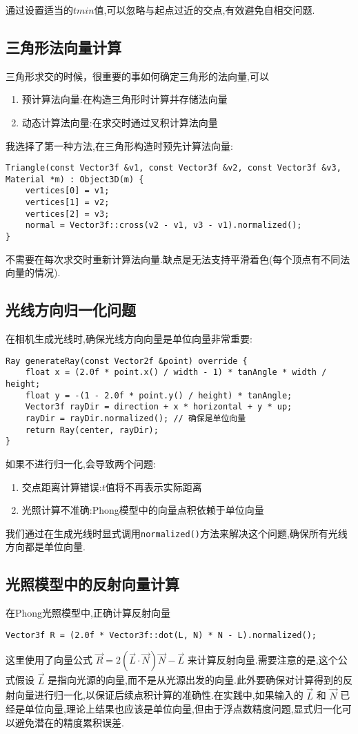\documentclass[a4paper,twoside]{article}
\begin{document}
通过设置适当的$tmin$值,可以忽略与起点过近的交点,有效避免自相交问题.

\subsection{三角形法向量计算}
三角形求交的时候，很重要的事如何确定三角形的法向量,可以

\begin{enumerate}
    \item 预计算法向量:在构造三角形时计算并存储法向量
    \item 动态计算法向量:在求交时通过叉积计算法向量
\end{enumerate}
我选择了第一种方法,在三角形构造时预先计算法向量:
\begin{verbatim}
Triangle(const Vector3f &v1, const Vector3f &v2, const Vector3f &v3, Material *m) : Object3D(m) {
    vertices[0] = v1;
    vertices[1] = v2;
    vertices[2] = v3;
    normal = Vector3f::cross(v2 - v1, v3 - v1).normalized();
}
\end{verbatim}

不需要在每次求交时重新计算法向量.缺点是无法支持平滑着色(每个顶点有不同法向量的情况).

\subsection{光线方向归一化问题}
在相机生成光线时,确保光线方向向量是单位向量非常重要:
\begin{verbatim}
Ray generateRay(const Vector2f &point) override {
    float x = (2.0f * point.x() / width - 1) * tanAngle * width / height;
    float y = -(1 - 2.0f * point.y() / height) * tanAngle;
    Vector3f rayDir = direction + x * horizontal + y * up;
    rayDir = rayDir.normalized(); // 确保是单位向量
    return Ray(center, rayDir);
}
\end{verbatim}

如果不进行归一化,会导致两个问题:
\begin{enumerate}
    \item 交点距离计算错误:$t$值将不再表示实际距离
    \item 光照计算不准确:Phong模型中的向量点积依赖于单位向量
\end{enumerate}

我们通过在生成光线时显式调用\texttt{normalized()}方法来解决这个问题,确保所有光线方向都是单位向量.

\subsection{光照模型中的反射向量计算}
在Phong光照模型中,正确计算反射向量
\begin{verbatim}
Vector3f R = (2.0f * Vector3f::dot(L, N) * N - L).normalized();
\end{verbatim}
这里使用了向量公式 $\vec{R} = 2(\vec{L} \cdot \vec{N})\vec{N} - \vec{L}$ 来计算反射向量.需要注意的是,这个公式假设 $\vec{L}$ 是指向光源的向量,而不是从光源出发的向量.此外要确保对计算得到的反射向量进行归一化,以保证后续点积计算的准确性.在实践中,如果输入的 $\vec{L}$ 和 $\vec{N}$ 已经是单位向量,理论上结果也应该是单位向量,但由于浮点数精度问题,显式归一化可以避免潜在的精度累积误差.
\end{document}

